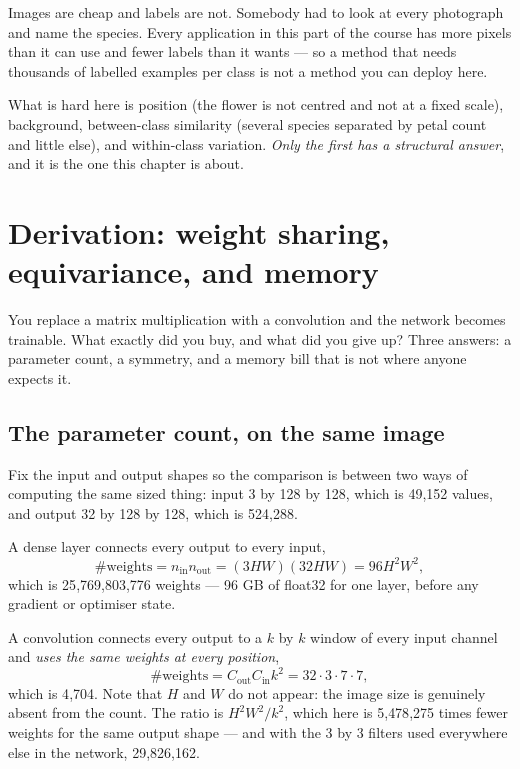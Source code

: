 \documentclass[11pt,a4paper]{article}
\begin{document}
\begin{keybox}[title={The standing constraint of applied vision}]
Images are cheap and labels are not. Somebody had to look at every photograph
and name the species. Every application in this part of the course has more
pixels than it can use and fewer labels than it wants --- so a method that
needs thousands of labelled examples per class is not a method you can deploy
here.
\end{keybox}

What is hard here is position (the flower is not centred and not at a fixed
scale), background, between-class similarity (several species separated by
petal count and little else), and within-class variation. \emph{Only the first
has a structural answer}, and it is the one this chapter is about.

\section{Derivation: weight sharing, equivariance, and memory}

You replace a matrix multiplication with a convolution and the network becomes
trainable. What exactly did you buy, and what did you give up? Three answers: a
parameter count, a symmetry, and a memory bill that is not where anyone expects
it.

\subsection{The parameter count, on the same image}

Fix the input and output shapes so the comparison is between two ways of
computing the same sized thing: input 3 by 128 by 128, which is 49{,}152
values, and output 32 by 128 by 128, which is 524{,}288.

A dense layer connects every output to every input,
\[ \#\text{weights} = n_{\text{in}}n_{\text{out}} = (3HW)(32HW) = 96H^2W^2, \]
which is 25{,}769{,}803{,}776 weights --- 96 GB of float32 for one layer,
before any gradient or optimiser state.

A convolution connects every output to a $k$ by $k$ window of every input
channel and \emph{uses the same weights at every position},
\[ \#\text{weights} = C_{\text{out}}C_{\text{in}}k^2 = 32\cdot3\cdot7\cdot7, \]
which is 4{,}704. Note that $H$ and $W$ do not appear: the image size is
genuinely absent from the count. The ratio is $H^2W^2/k^2$, which here is
5{,}478{,}275 times fewer weights for the same output shape --- and with the 3
by 3 filters used everywhere else in the network, 29{,}826{,}162.
\end{document}

